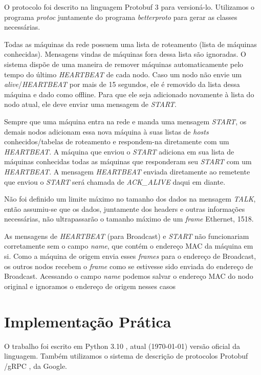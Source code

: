 O protocolo foi descrito na linguagem Protobuf 3 \cite{protobuf} para versioná-lo. Utilizamos o programa \textit{protoc} \cite{protoc} juntamente do programa \textit{betterproto} \cite{betterproto} para gerar as classes necessárias.

Todas as máquinas da rede possuem uma lista de roteamento (lista de máquinas conhecidas). Mensagens vindas de máquinas fora dessa
lista são ignoradas.
O sistema dispõe de uma maneira de remover máquinas automaticamente pelo tempo do último \textit{HEARTBEAT} de cada nodo.
Caso um nodo não envie um \textit{alive}/\textit{HEARTBEAT} por mais de 15 segundos, ele é removido da lista dessa máquina e dado como
offline. Para que ele seja adicionado novamente à lista do nodo atual, ele deve enviar uma mensagem de \textit{START}.

Sempre que uma máquina entra na rede e manda uma mensagem \textit{START}, os demais nodos adicionam essa nova máquina à suas listas de \textit{hosts} conhecidos/tabelas de roteamento e respondem-na diretamente com um \textit{HEARTBEAT}. A máquina que enviou o \textit{START} adiciona em sua lista de máquinas conhecidas todas as máquinas que responderam seu \textit{START} com um \textit{HEARTBEAT}.
A mensagem \textit{HEARTBEAT} enviada diretamente ao remetente que enviou o \textit{START} será chamada de \textit{ACK\_ALIVE} daqui em diante.

Não foi definido um limite máximo no tamanho dos dados na mensagem \textit{TALK}, então assumiu-se que os dados, juntamente dos headers e outras informações necessárias,
não ultrapassarão o tamanho máximo de um \textit{frame} Ethernet, \SI{1518}{\byte}.

As mensagens de \textit{HEARTBEAT} (para Broadcast) e \textit{START} não funcionariam corretamente sem o campo \textit{name}, que contém
o endereço MAC da máquina em si. Como a máquina de origem envia esses \textit{frames} para o endereço de Broadcast, os outros nodos
recebem o \textit{frame} como se estivesse sido enviada do endereço de Broadcast.
Acessando o campo \textit{name} podemos salvar o endereço MAC do nodo original e ignoramos o endereço de origem nesses casos

\section{Implementação Prática}

O trabalho foi escrito em Python 3.10 \cite{py310}, atual (\today) versão oficial da linguagem. 
Também utilizamos o sistema de descrição de protocolos Protobuf \cite{protobuf}/gRPC \cite{grpc}, da Google.

